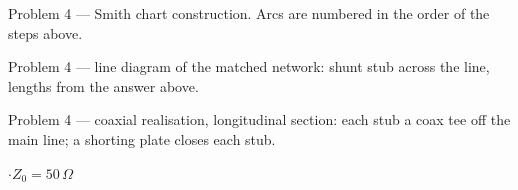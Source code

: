 {\footnotesize\color{sub} Problem 4 --- Smith chart construction. Arcs are numbered in the order of the steps above.}

{\footnotesize\color{sub} Problem 4 --- line diagram of the matched network: shunt stub across the line, lengths from the answer above.}

{\footnotesize\color{sub} Problem 4 --- coaxial realisation, longitudinal section: each stub a coax tee off the main line; a shorting plate closes each stub.}

\vspace{2pt}

{\color{sub}\footnotesize {} \gap$\cdot$\gap $Z_0 = 50\,\Omega$}

